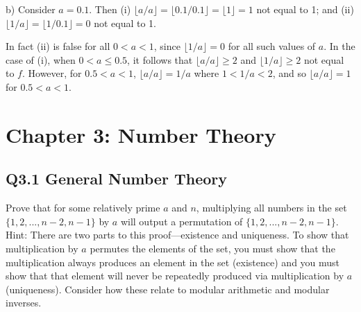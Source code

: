 \documentclass{article}
\begin{document}
b) Consider \( a = 0.1 \). Then
(i) \( \lfloor a/a \rfloor = \lfloor 0.1/0.1 \rfloor = \lfloor 1 \rfloor = 1 \) not equal to 1; and
(ii) \( \lfloor 1/a \rfloor = \lfloor 1/0.1 \rfloor = 0 \) not equal to 1.

In fact (ii) is false for all \( 0 < a < 1 \), since \( \lfloor 1/a \rfloor = 0 \) for all such values of \( a \). In the case of (i), when \( 0 < a \leq 0.5 \), it follows that \( \lfloor a/a \rfloor \geq 2 \) and \( \lfloor 1/a \rfloor \geq 2 \) not equal to \( f \). However, for \( 0.5 < a < 1 \), \( \lfloor a/a \rfloor = 1/a \) where \( 1 < 1/a < 2 \), and so \( \lfloor a/a \rfloor = 1 \) for \( 0.5 < a < 1 \).
\newpage




\section*{Chapter 3: Number Theory}
\subsection*{Q3.1 General Number Theory}
Prove that for some relatively prime $a$ and $n$, multiplying all numbers in the set $\{1,2,...,n-2,n-1\}$ by $a$ will output a permutation of $\{1,2,...,n-2,n-1\}$.
\\ Hint: There are two parts to this proof---existence and uniqueness. To show that multiplication by $a$ permutes the elements of the set, you must show that the multiplication always produces an element in the set (existence) and you must show that that element will never be repeatedly produced via multiplication by $a$ (uniqueness). Consider how these relate to modular arithmetic and modular inverses.
\newpage
\end{document}

